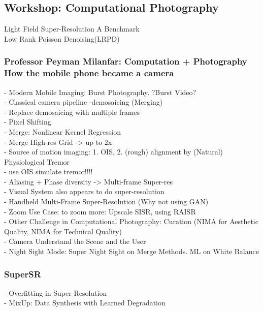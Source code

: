 \subsection{Workshop: Computational Photography}
Light Field Super-Resolution A Benchmark\\

Low Rank Poisson Denoising(LRPD)\\

\subsubsection{Professor Peyman Milanfar: Computation + Photography How the mobile phone became a camera}
    - Modern Mobile Imaging: Burst Photography. ?Burst Video?\\
    - Classical camera pipeline -demosaicing (Merging)\\
    - Replace demosaicing with multiple frames\\
    - Pixel Shifting\\
    - Merge: Nonlinear Kernel Regression\\
    - Merge High-res Grid -> up to 2x\\
    - Source of motion imaging: 1. OIS, 2. (rough) alignment by (Natural) Physiological Tremor\\
    - use OIS simulate tremor!!!!\\
    - Aliasing + Phase diversity -> Multi-frame Super-res\\
    - Visual System also appears to do super-resolution\\
    - Handheld Multi-Frame Super-Resolution (Why not using GAN)\\
    - Zoom Use Case: to zoom more: Upscale SISR, using RAISR\\
    - Other Challenge in Computational Photography: Curation (NIMA for Aesthetic Quality, NIMA for Technical Quality)\\
    - Camera Understand the Scene and the User\\
    - Night Sight Mode: Super Night Sight on Merge Methods. ML on White Balance\\

\subsubsection{SuperSR}
    - Overfitting in Super Resolution\\
    - MixUp: Data Synthesis with Learned Degradation\\
